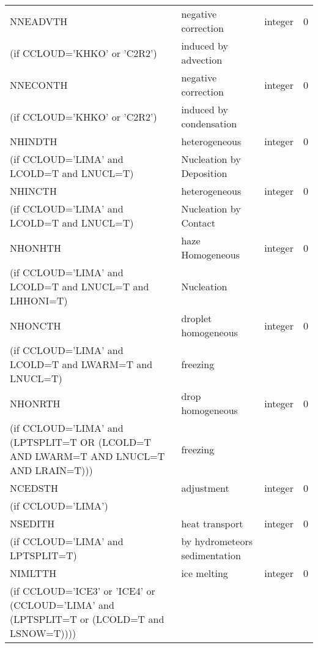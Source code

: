 \begin{longtable} {|p{}|p{}|>{\centering}p{}|p{}<{\centering}|}
 NNEADVTH  & negative correction       & integer  &  0 \index{NNEADVTH!\innam{NAM\_BU\_RTH}}\\ \nopagebreak
(if CCLOUD='KHKO' or 'C2R2')   &induced by advection   &       &   \\\hline
 NNECONTH  & negative correction       & integer  &  0 \index{NNECONTH!\innam{NAM\_BU\_RTH}}\\ \nopagebreak
(if CCLOUD='KHKO' or 'C2R2')   &induced by condensation   &       &   \\\hline
NHINDTH   & heterogeneous & integer  &  0 \index{NHINDTH!\innam{NAM\_BU\_RTH}}\\ \nopagebreak
(if CCLOUD='LIMA' and LCOLD=T and LNUCL=T)   &Nucleation by Deposition   &       &   \\\hline
NHINCTH   & heterogeneous & integer  &  0 \index{NHINCTH!\innam{NAM\_BU\_RTH}}\\ \nopagebreak
(if CCLOUD='LIMA' and LCOLD=T and LNUCL=T)   & Nucleation by Contact  &       &   \\\hline
NHONHTH   & haze Homogeneous       & integer  &  0 \index{NHONHTH!\innam{NAM\_BU\_RTH}}\\ \nopagebreak
(if CCLOUD='LIMA' and LCOLD=T and LNUCL=T and LHHONI=T)   &   Nucleation&       &   \\\hline
NHONCTH   &  droplet homogeneous      & integer  &  0 \index{NHONCTH!\innam{NAM\_BU\_RTH}}\\ \nopagebreak
(if CCLOUD='LIMA' and LCOLD=T and LWARM=T and LNUCL=T)   &freezing   &       &   \\\hline
NHONRTH   & drop homogeneous       & integer  &  0 \index{NHONRTH!\innam{NAM\_BU\_RTH}}\\ \nopagebreak
(if CCLOUD='LIMA' and (LPTSPLIT=T OR (LCOLD=T AND LWARM=T AND LNUCL=T AND LRAIN=T)))   & freezing  &       &   \\\hline
NCEDSTH   & adjustment      & integer  &  0 \index{NCEDSTH!\innam{NAM\_BU\_RTH}}\\ \nopagebreak
(if CCLOUD='LIMA')   &   &       &   \\\hline
NSEDITH   &  heat transport & integer  &  0 \index{NSEDITH!\innam{NAM\_BU\_RTH}}\\ \nopagebreak
(if CCLOUD='LIMA' and LPTSPLIT=T)   &by hydrometeors sedimentation   &       &   \\\hline
NIMLTTH   & ice melting      & integer  &  0 \index{NIMLTTH!\innam{NAM\_BU\_RTH}}\\ \nopagebreak
(if CCLOUD='ICE3' or 'ICE4' or (CCLOUD='LIMA' and (LPTSPLIT=T or (LCOLD=T and LSNOW=T)))) & &   &  \\\hline
\end{longtable}

